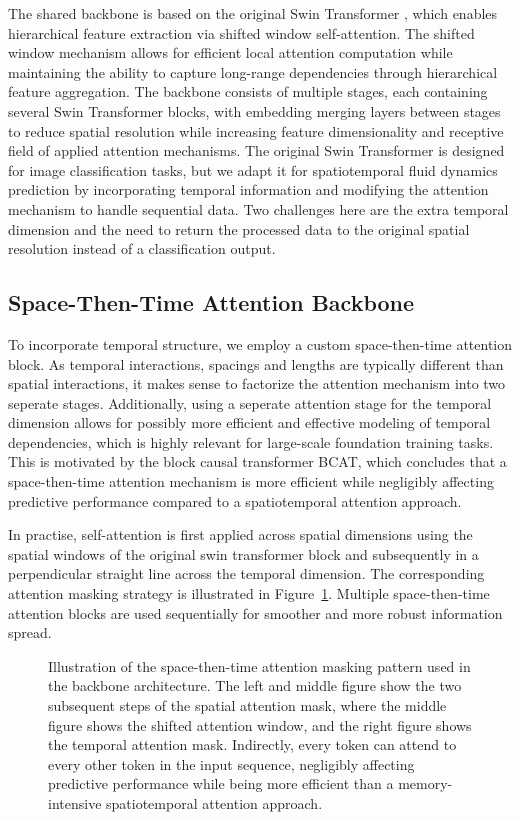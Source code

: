 The shared backbone is based on the original Swin Transformer \cite{liu2021swin}, which enables hierarchical feature extraction via shifted window self-attention. The shifted window mechanism allows for efficient local attention computation while maintaining the ability to capture long-range dependencies through hierarchical feature aggregation. The backbone consists of multiple stages, each containing several Swin Transformer blocks, with embedding merging layers between stages to reduce spatial resolution while increasing feature dimensionality and receptive field of applied attention mechanisms. The original Swin Transformer is designed for image classification tasks, but we adapt it for spatiotemporal fluid dynamics prediction by incorporating temporal information and modifying the attention mechanism to handle sequential data. Two challenges here are the extra temporal dimension and the need to return the processed data to the original spatial resolution instead of a classification output.

\subsection{Space-Then-Time Attention Backbone}

To incorporate temporal structure, we employ a custom space-then-time attention block. As temporal interactions, spacings and lengths are typically different than spatial interactions, it makes sense to factorize the attention mechanism into two seperate stages. Additionally, using a seperate attention stage for the temporal dimension allows for possibly more efficient and effective modeling of temporal dependencies, which is highly relevant for large-scale foundation training tasks. This is motivated by the block causal transformer BCAT, which concludes that a space-then-time attention mechanism is more efficient while negligibly affecting predictive performance compared to a spatiotemporal attention approach. \cite{liu2025bcat}

In practise, self-attention is first applied across spatial dimensions using the spatial windows of the original swin transformer block and subsequently in a perpendicular straight line across the temporal dimension. The corresponding attention masking strategy is illustrated in Figure~\ref{fig:BlockExplainer}. Multiple space-then-time attention blocks are used sequentially for smoother and more robust information spread. 

\begin{figure}[h]
	\centering
	\makebox[\textwidth][c]{
		
	}
	\caption{Illustration of the space-then-time attention masking pattern used in the backbone architecture. The left and middle figure show the two subsequent steps of the spatial attention mask, where the middle figure shows the shifted attention window, and the right figure shows the temporal attention mask. Indirectly, every token can attend to every other token in the input sequence, negligibly affecting predictive performance while being more efficient than a memory-intensive spatiotemporal attention approach.}
	\label{fig:BlockExplainer}
\end{figure}

